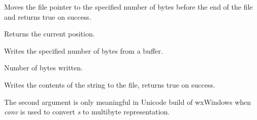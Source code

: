 
Moves the file pointer to the specified number of bytes before the end of the file
and returns true on success.



\label{wxffiletell}


Returns the current position.

\label{wxffilewrite}


Writes the specified number of bytes from a buffer.





Number of bytes written.

\label{wxffilewrites}


Writes the contents of the string to the file, returns true on success.

The second argument is only meaningful in Unicode build of wxWindows when
{\it conv} is used to convert {\it s} to multibyte representation.


